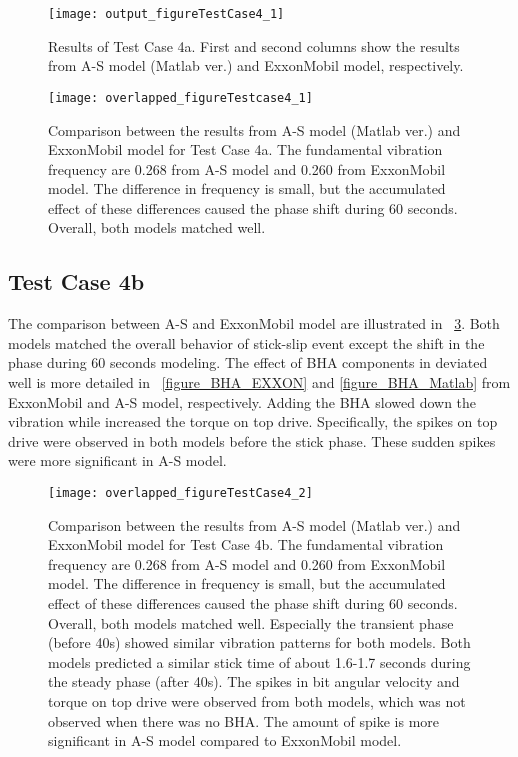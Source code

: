 \begin{figure}
  \centering
  \texttt{[image: output\_figureTestCase4\_1]}
  \caption[Results of Test Case 4a]{Results of Test Case 4a. First and second columns show the results from A-S model (Matlab ver.) and ExxonMobil model, respectively.}\label{figure_testcase4_1}
\end{figure}

\begin{figure}
  \centering
  \texttt{[image: overlapped\_figureTestcase4\_1]}
  \caption[Comparison of the results for Test Case 4a]{Comparison between the results from A-S model (Matlab ver.) and ExxonMobil model for Test Case 4a. The fundamental vibration frequency are 0.268 from A-S model and 0.260 from ExxonMobil model. The difference in frequency is small, but the accumulated effect of these differences caused the phase shift during 60 seconds. Overall, both models matched well.}\label{figure_testCase4_1_overlapped}
\end{figure}


\subsection{Test Case 4b}
The comparison between A-S and ExxonMobil model are illustrated in \figurename~\ref{figure_testcase4_2_overlapped}. Both models matched the overall behavior of stick-slip event except the shift in the phase during 60 seconds modeling. The effect of BHA components in deviated well is more detailed in \figurename~\ref{figure_BHA_EXXON} and \ref{figure_BHA_Matlab} from ExxonMobil and A-S model, respectively. Adding the BHA slowed down the vibration while increased the torque on top drive. Specifically, the spikes on top drive were observed in both models before the stick phase. These sudden spikes were more significant in A-S model.


\begin{figure}
  \centering
  \texttt{[image: overlapped\_figureTestCase4\_2]}
  \caption[Comparison of the results for Test Case 4b]{Comparison between the results from A-S model (Matlab ver.) and ExxonMobil model for Test Case 4b. The fundamental vibration frequency are 0.268 from A-S model and 0.260 from ExxonMobil model. The difference in frequency is small, but the accumulated effect of these differences caused the phase shift during 60 seconds. Overall, both models matched well. Especially the transient phase (before 40s) showed similar vibration patterns for both models. Both models predicted a similar stick time of about 1.6-1.7 seconds during the steady phase (after 40s). The spikes in bit angular velocity and torque on top drive were observed from both models, which was not observed when there was no BHA. The amount of spike is more significant in A-S model compared to ExxonMobil model.}\label{figure_testcase4_2_overlapped}
\end{figure}

